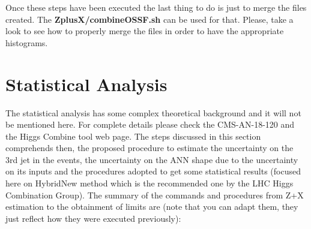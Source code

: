 \documentclass[]{report}
\begin{document}
Once these steps have been executed the last thing to do is just to merge the files created. The \textbf{ZplusX/combineOSSF.sh} can be used for that. Please, take a look to see how to properly merge the files in order to have the appropriate histograms.

\section{Statistical Analysis}
The statistical analysis has some complex theoretical background and it will not be mentioned here. For complete details please check the CMS-AN-18-120 and the Higgs Combine tool web page. The steps discussed in this section comprehends then, the proposed procedure to estimate the uncertainty on the 3rd jet in the events, the uncertainty on the ANN shape due to the uncertainty on its inputs and the procedures adopted to get some statistical results (focused here on HybridNew method which is the recommended one by the LHC Higgs Combination Group). The summary of the commands and procedures from Z+X estimation to the obtainment of limits are (note that you can adapt them, they just reflect how they were executed previously):
\end{document}
